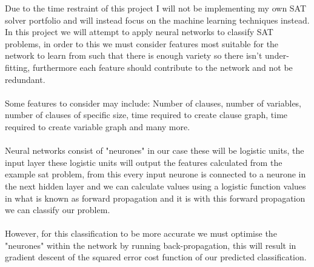 \documentclass[12pt,a4paper]{article}
\begin{document}
Due to the time restraint of this project I will not be implementing my own SAT solver portfolio and will instead focus on the machine learning techniques instead. In this project we will attempt to apply neural networks to classify SAT problems, in order to this we must consider features most suitable for the network to learn from such that there is enough variety so there isn't under-fitting, furthermore each feature should contribute to the network and not be redundant. \\\\ 
Some features \cite{machineLearningFeatures} to consider may include: Number of clauses, number of variables, number of clauses of specific size, time required to create clause graph, time required to create variable graph and many more.\\\\
Neural networks consist of "neurones" in our case these will be logistic units, the input layer these logistic units will output the features calculated from the example sat problem, from this every input neurone is connected to a neurone in the next hidden layer and we can calculate values using a logistic function values in what is known as forward propagation and it is with this forward propagation we can classify our problem.\\\\
However, for this classification to be more accurate we must optimise the "neurones" within the network by running back-propagation, this will result in gradient descent of the squared error cost function of our predicted classification.\\\\
\end{document}
